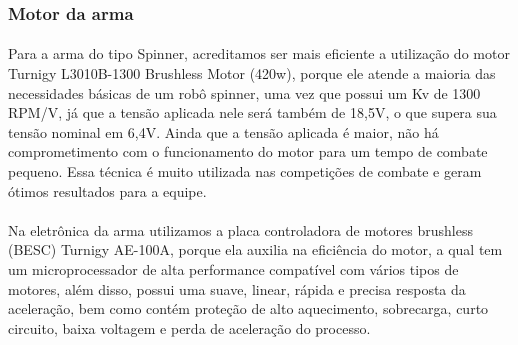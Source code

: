 \documentclass{article}
\begin{document}
            \subsubsection{Motor da arma}
                \paragraph{}
                Para a arma do tipo Spinner, acreditamos ser mais eficiente a utilização do motor Turnigy L3010B-1300 Brushless Motor (420w), porque ele atende a maioria das necessidades básicas de um robô spinner, uma vez que possui um Kv de 1300 RPM/V, já que a tensão aplicada nele será também de 18,5V, o que supera sua tensão nominal em 6,4V. Ainda que a tensão aplicada é maior, não há comprometimento com o funcionamento do motor para um tempo de combate pequeno. Essa técnica é muito utilizada nas competições de combate e geram ótimos resultados para a equipe.
                \paragraph{}
                Na eletrônica da arma utilizamos a placa controladora de motores brushless (BESC) Turnigy AE-100A, porque ela auxilia na eficiência do motor, a qual tem um microprocessador de alta performance compatível com vários tipos de motores, além disso, possui uma suave, linear, rápida e precisa resposta da aceleração, bem como contém proteção de alto aquecimento, sobrecarga, curto circuito, baixa voltagem e perda de aceleração do processo.
\end{document}
